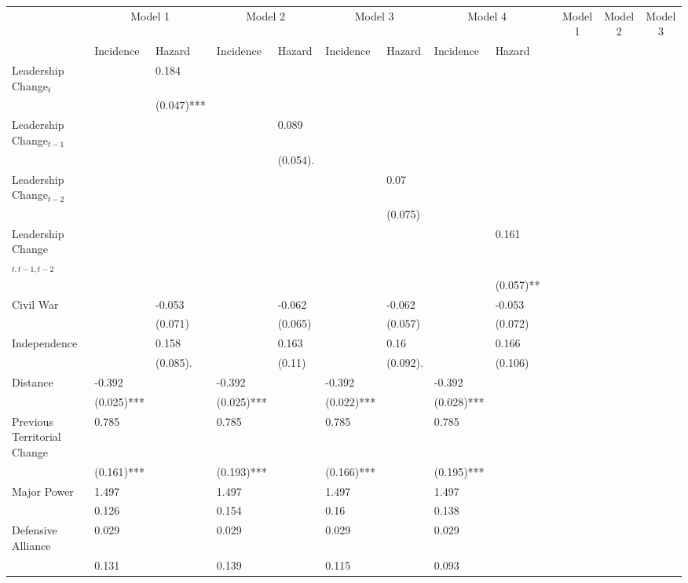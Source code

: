 \begin{table}[ht]
\centering
\begin{tabular}{lllllllll}
  \toprule
  \midrule
 & \multicolumn{2}{c}{Model 1} & \multicolumn{2}{c}{Model 2} & \multicolumn{2}{c}{Model 3} & \multicolumn{2}{c}{Model 4} &  & \multicolumn{2}{c}{Model 1} & \multicolumn{2}{c}{Model 2} & \multicolumn{2}{c}{Model 3} \\ 
   & Incidence & Hazard & Incidence & Hazard & Incidence & Hazard & Incidence & Hazard \\ 
  Leadership Change$_{t}$ &  & 0.184 &  &  &  &  &  &  \\ 
   &  & (0.047)*** &  &  &  &  &  &  \\ 
  Leadership Change$_{t-1}$ &  &  &  & 0.089 &  &  &  &  \\ 
   &  &  &  & (0.054). &  &  &  &  \\ 
  Leadership Change$_{t-2}$ &  &  &  &  &  & 0.07 &  &  \\ 
   &  &  &  &  &  & (0.075)  &  &  \\ 
  Leadership Change$_{t, t-1, t-2}$ &  &  &  &  &  &  &  & 0.161 \\ 
   &  &  &  &  &  &  &  & (0.057)** \\ 
  Civil War &  & -0.053 &  & -0.062 &  & -0.062 &  & -0.053 \\ 
   &  & (0.071)  &  & (0.065)  &  & (0.057)  &  & (0.072)  \\ 
  Independence &  & 0.158 &  & 0.163 &  & 0.16 &  & 0.166 \\ 
   &  & (0.085). &  & (0.11)  &  & (0.092). &  & (0.106)  \\ 
  Distance & -0.392 &  & -0.392 &  & -0.392 &  & -0.392 &  \\ 
   & (0.025)*** &  & (0.025)*** &  & (0.022)*** &  & (0.028)*** &  \\ 
  Previous Territorial Change & 0.785 &  & 0.785 &  & 0.785 &  & 0.785 &  \\ 
   & (0.161)*** &  & (0.193)*** &  & (0.166)*** &  & (0.195)*** &  \\ 
  Major Power & 1.497 &  & 1.497 &  & 1.497 &  & 1.497 &  \\ 
   & 0.126 &  & 0.154 &  & 0.16 &  & 0.138 &  \\ 
  Defensive Alliance & 0.029 &  & 0.029 &  & 0.029 &  & 0.029 &  \\ 
   & 0.131 &  & 0.139 &  & 0.115 &  & 0.093 &  \\ 

\end{tabular}
\end{table}
